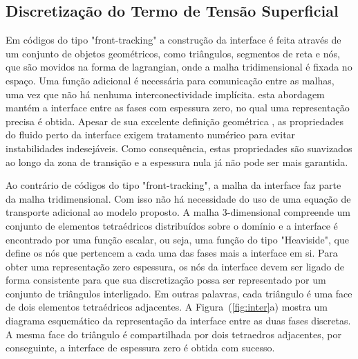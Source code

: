 \documentclass[a4paper,portuges]{article}
\begin{document}
\subsection{Discretização do Termo de Tensão Superficial}

Em códigos do tipo "front-tracking" a construção da interface é feita
através de um conjunto de objetos geométricos, como triângulos,
segmentos de reta e nós, que são movidos na forma de lagrangian, onde a
malha tridimensional é fixada no espaço. Uma função adicional é necessária
para comunicação entre as malhas, uma vez que não há nenhuma
interconectividade implícita. esta abordagem mantém a interface entre as
fases com espessura zero, no qual uma representação precisa é obtida.
Apesar de sua excelente definição geométrica , as propriedades do fluido
perto da interface exigem tratamento numérico para evitar instabilidades
indesejáveis. Como consequência, estas propriedades são suavizados ao
longo da zona de transição e a espessura nula já não pode ser mais
garantida.

Ao contrário de códigos do tipo "front-tracking", a malha da interface
faz parte da malha tridimensional. Com isso não há necessidade do uso de
uma equação de transporte adicional ao modelo proposto. A malha
3-dimensional compreende um conjunto de elementos tetraédricos
distribuídos sobre o domínio e a interface é encontrado por uma função
escalar, ou seja, uma função do tipo "Heaviside", que define os nós que
pertencem a cada uma das fases mais a interface em si. Para obter uma
representação zero espessura, os nós da interface devem ser ligado de
forma consistente para que sua discretização possa ser representado por
um conjunto de triângulos interligado. Em outras palavras, cada
triângulo é uma face de dois elementos tetraédricos adjacentes. A
Figura~(\ref{fig:inter}a) mostra um diagrama esquemático da
representação da interface entre as duas fases discretas. A mesma face
do triângulo é compartilhada por dois tetraedros adjacentes, por
conseguinte, a interface de espessura zero é obtida com sucesso.
\end{document}
